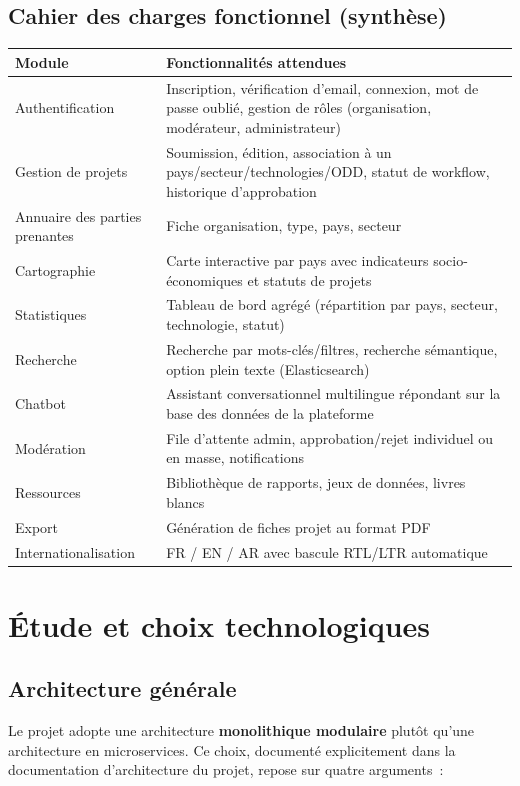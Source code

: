 \documentclass[11pt,a4paper]{report}
\begin{document}
\section{Cahier des charges fonctionnel (synthèse)}

\begin{longtable}{@{}p{4cm}p{10.5cm}@{}}
\toprule
\textbf{Module} & \textbf{Fonctionnalités attendues} \\
\midrule
\endhead
Authentification & Inscription, vérification d'email, connexion, mot de passe oublié, gestion de rôles (organisation, modérateur, administrateur) \\
Gestion de projets & Soumission, édition, association à un pays/secteur/technologies/ODD, statut de workflow, historique d'approbation \\
Annuaire des parties prenantes & Fiche organisation, type, pays, secteur \\
Cartographie & Carte interactive par pays avec indicateurs socio-économiques et statuts de projets \\
Statistiques & Tableau de bord agrégé (répartition par pays, secteur, technologie, statut) \\
Recherche & Recherche par mots-clés/filtres, recherche sémantique, option plein texte (Elasticsearch) \\
Chatbot & Assistant conversationnel multilingue répondant sur la base des données de la plateforme \\
Modération & File d'attente admin, approbation/rejet individuel ou en masse, notifications \\
Ressources & Bibliothèque de rapports, jeux de données, livres blancs \\
Export & Génération de fiches projet au format PDF \\
Internationalisation & FR / EN / AR avec bascule RTL/LTR automatique \\
\bottomrule
\end{longtable}

\chapter{Étude et choix technologiques}

\section{Architecture générale}

Le projet adopte une architecture \textbf{monolithique modulaire} plutôt qu'une architecture en
microservices. Ce choix, documenté explicitement dans la documentation d'architecture du projet, repose sur
quatre arguments~:
\end{document}
